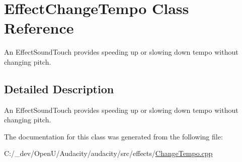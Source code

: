\hypertarget{class_effect_change_tempo}{}\section{Effect\+Change\+Tempo Class Reference}
\label{class_effect_change_tempo}


An Effect\+Sound\+Touch provides speeding up or slowing down tempo without changing pitch.  




\subsection{Detailed Description}
An Effect\+Sound\+Touch provides speeding up or slowing down tempo without changing pitch. 

The documentation for this class was generated from the following file\+:\begin{DoxyCompactItemize}
\item 
C\+:/\+\_\+dev/\+Open\+U/\+Audacity/audacity/src/effects/\hyperlink{_change_tempo_8cpp}{Change\+Tempo.\+cpp}\end{DoxyCompactItemize}
